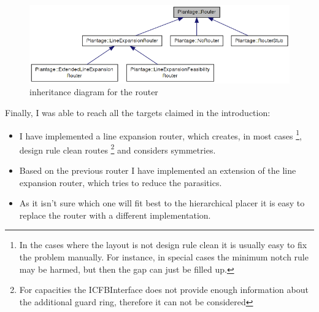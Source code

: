 \begin{figure}
	\centering
	\includegraphics[scale=.6]{FIG/class_diagram_router.png}
  	\caption{inheritance diagram for the router}
	\label{fig:class_diagram_router}
\end{figure}

Finally, I was able to reach all the targets claimed in the introduction:
\begin{itemize}
\item I have implemented a line expansion router, which creates, in most cases \footnote{In the cases where the layout is not design rule clean it is usually easy to fix the problem manually. For instance, in special cases the minimum notch rule may be harmed, but then the gap can just be filled up.}, design rule clean routes \footnote{For capacities the ICFBInterface does not provide enough information about the additional guard ring, therefore it can not be considered} and considers symmetries.
\item Based on the previous router I have implemented an extension of the line expansion router, which tries to reduce the parasitics.
\item As it isn't sure which one will fit best to the hierarchical placer it is easy to replace the router with a different implementation.
\end{itemize}

